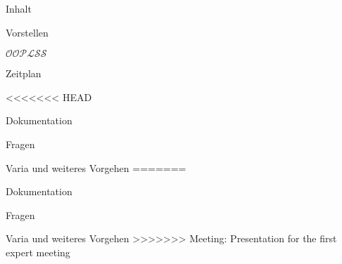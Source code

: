 
\begin{frame}
  \titlepage
\end{frame}

\begin{frame}[t]{Inhalt}
  \begin{bigitemize}[<+->]{3mm}
    \item<1-> Vorstellen

    \item<2-> $\mathcal{OOPLSS}$

    \item<3-> Zeitplan

<<<<<<< HEAD
    \item<4-> Dokumentation

    \item<5-> Fragen

    \item<6-> Varia und weiteres Vorgehen
=======
    \item<3-> Dokumentation

    \item<4-> Fragen

    \item<5-> Varia und weiteres Vorgehen
>>>>>>> Meeting: Presentation for the first expert meeting
  \end{bigitemize}
\end{frame}
